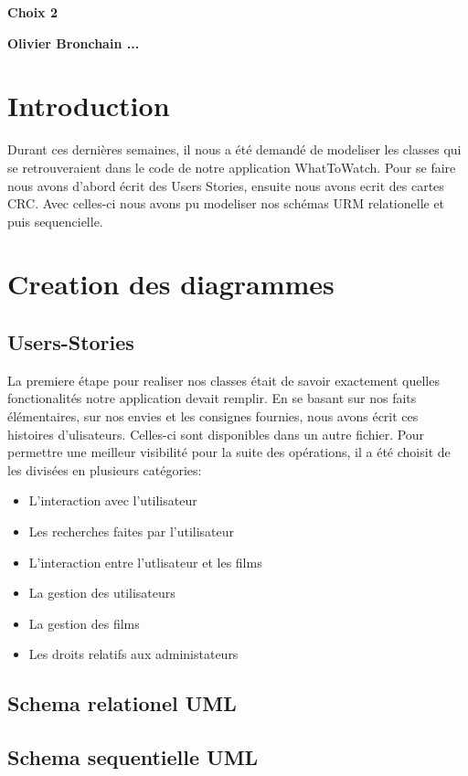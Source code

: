 \documentclass[10pt,a4paper]{article}
\begin{document}
\begin{center}
\Huge{\textbf{Choix 2}}

\large{\textbf{Olivier Bronchain ...}}

\end{center}

\section{Introduction}
	Durant ces dernières semaines, il nous a été demandé de modeliser les classes qui se retrouveraient dans le code de notre application WhatToWatch. Pour se faire nous avons d'abord écrit des Users Stories, ensuite nous avons ecrit des cartes CRC. Avec celles-ci nous avons pu modeliser nos schémas URM relationelle et puis sequencielle.
\section{Creation des diagrammes}
\subsection{Users-Stories}
	La premiere étape pour realiser nos classes était de savoir exactement quelles fonctionalités notre application devait remplir. En se basant sur nos faits élémentaires, sur nos envies et les consignes fournies, nous avons écrit ces histoires d'ulisateurs. Celles-ci sont disponibles dans un autre fichier. Pour permettre une meilleur visibilité pour la suite des opérations, il a été choisit de les divisées en plusieurs catégories:
	\begin{itemize}
		\item L'interaction avec l'utilisateur
		\item Les recherches faites par l'utilisateur
		\item L'interaction entre l'utlisateur et les films
		\item La gestion des utilisateurs
		\item La gestion des films
		\item Les droits relatifs aux administateurs
	\end{itemize}
\subsection{Schema relationel UML}

\subsection{Schema sequentielle UML}
\end{document}
